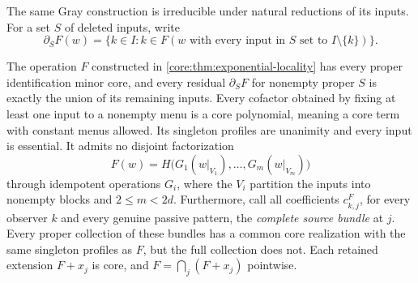 

The same Gray construction is irreducible under natural reductions of its inputs.
For a set $S$ of deleted inputs, write
\[
 \partial_SF(w)=\{k\in I:k\in
 F(w\text{ with every input in }S\text{ set to }I\setminus\{k\})\}.
\]

\begin{corollary}
\label{core:cor:prime-obstructions}
The operation $F$ constructed in \cref{core:thm:exponential-locality}
has every proper identification minor core, and every residual
$\partial_SF$ for nonempty proper $S$ is exactly the union of its
remaining inputs. Every cofactor obtained by fixing at least one input
to a nonempty menu is a core polynomial, meaning a core term with constant
menus allowed. Its singleton profiles are unanimity and every input
is essential. It admits no disjoint factorization
\[
 F(w)=H\bigl(G_1(w|_{V_1}),\ldots,G_m(w|_{V_m})\bigr)
\]
through idempotent operations $G_i$, where the $V_i$ partition the inputs
into nonempty blocks and $2\leq m<2d$.
Furthermore, call all coefficients $c^F_{k,j}$, for every observer $k$
and every genuine passive pattern, the \emph{complete source bundle} at $j$.
Every proper collection of these bundles has a common core realization
with the same singleton profiles as $F$, but the full collection does not.
Each retained extension $F+ x_j$ is core, and
$F=\bigcap_j(F+x_j)$ pointwise.
\end{corollary}
